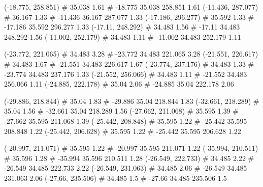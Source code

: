 \documentclass[a4paper,openbib,10pt]{article}
\newenvironment{treegraph}{\begin{graph}}{\end{graph}}
\begin{document}
\begin{treegraph}
  (-18.775, 258.851) #     35.038    1.61
   #    -18.775    35.038    258.851    1.61
  (-11.436, 287.077) #     36.167    1.33
   #    -11.436    36.167    287.077    1.33
  (-17.186, 296.277) #     35.592    1.33
   #    -17.186    35.592    296.277    1.33
  (-17.11, 248.292) #     34.483    1.56
   #    -17.11    34.483    248.292    1.56
  (-11.002, 252.179) #     34.483    1.11
   #    -11.002    34.483    252.179    1.11

  (-23.772, 221.065) #     34.483    3.28
   #    -23.772    34.483    221.065    3.28
  (-21.551, 226.617) #     34.483    1.67
   #    -21.551    34.483    226.617    1.67
  (-23.774, 237.176) #     34.483    1.33
   #    -23.774    34.483    237.176    1.33
  (-21.552, 256.066) #     34.483    1.11
   #    -21.552    34.483    256.066    1.11
  (-24.885, 222.178) #     35.04    2.06
   #    -24.885    35.04    222.178    2.06

  (-29.886, 218.844) #     35.04    1.83
   #    -29.886    35.04    218.844    1.83
  (-32.661, 218.289) #     35.04    1.56
   #    -32.661    35.04    218.289    1.56
  (-27.662, 211.068) #     35.595    1.39
   #    -27.662    35.595    211.068    1.39
  (-25.442, 208.848) #     35.595    1.22
   #    -25.442    35.595    208.848    1.22
  (-25.442, 206.628) #     35.595    1.22
   #    -25.442    35.595    206.628    1.22

  (-20.997, 211.071) #     35.595    1.22
   #    -20.997    35.595    211.071    1.22
  (-35.994, 210.511) #     35.596    1.28
   #    -35.994    35.596    210.511    1.28
  (-26.549, 222.733) #     34.485    2.22
   #    -26.549    34.485    222.733    2.22
  (-26.549, 231.063) #     34.485    2.06
   #    -26.549    34.485    231.063    2.06
  (-27.66, 235.506) #     34.485    1.5
   #    -27.66    34.485    235.506    1.5


\end{treegraph}
\end{document}
